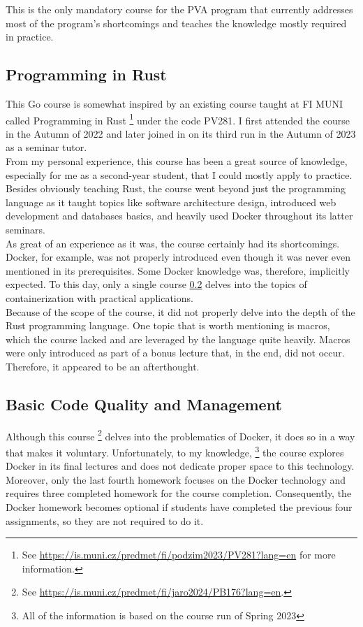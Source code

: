 \documentclass[
  digital,
  color,
  oneside,
  nosansbold,
  nocolorbold,
  lof,
  lot,
]{fithesis4}
\begin{document}
This is the only mandatory course for the PVA program that currently addresses most of the program's shortcomings and teaches the knowledge mostly required in practice.

\subsection{Programming in Rust}

This Go course is somewhat inspired by an existing course taught at FI MUNI called Programming in Rust 
\footnote{See \url{https://is.muni.cz/predmet/fi/podzim2023/PV281?lang=en} for more information.}
under the code PV281. I first attended the course in the Autumn of 2022 and later joined in on its third run in the Autumn of 2023 as a seminar tutor. \\

From my personal experience, this course has been a great source of knowledge, especially for me as a second-year student, that I could mostly apply to practice. Besides obviously teaching Rust, the course went beyond just the programming language as it taught topics like software architecture design, introduced web development and databases basics, and heavily used Docker throughout its latter seminars. \\

As great of an experience as it was, the course certainly had its shortcomings. Docker, for example, was not properly introduced even though it was never even mentioned in its prerequisites. Some Docker knowledge was, therefore, implicitly expected. To this day, only a single course \ref{code-quality-and-management} delves into the topics of containerization with practical applications. \\

Because of the scope of the course, it did not properly delve into the depth of the Rust programming language. One topic that is worth mentioning is macros, which the course lacked and are leveraged by the language quite heavily. Macros were only introduced as part of a bonus lecture that, in the end, did not occur. Therefore, it appeared to be an afterthought.

\subsection{Basic Code Quality and Management} \label{code-quality-and-management}

Although this course
\footnote{See \url{https://is.muni.cz/predmet/fi/jaro2024/PB176?lang=en}.}
delves into the problematics of Docker, it does so in a way that makes it voluntary. Unfortunately, to my knowledge, 
\footnote{All of the information is based on the course run of Spring 2023} the course explores Docker in its final lectures and does not dedicate proper space to this technology. Moreover, only the last fourth homework focuses on the Docker technology and requires three completed homework for the course completion. Consequently, the Docker homework becomes optional if students have completed the previous four assignments, so they are not required to do it.
\end{document}
